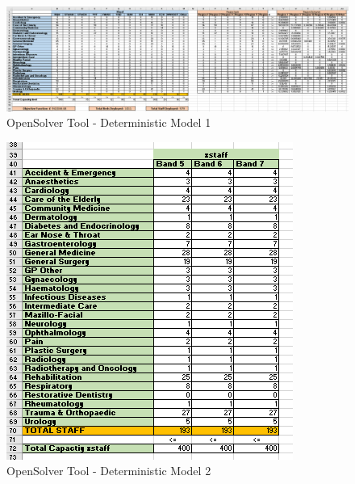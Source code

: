 \documentclass[../thesis.tex]{subfiles}
\begin{document}
\begin{landscape}
\begin{figure}[h!]
    \centering
    \includegraphics{Chapters/Chapter7/Figures/Deterministic1.png}
    \caption{OpenSolver Tool - Deterministic Model 1}
    \label{fig:exdm1}
\end{figure}
\end{landscape}
\begin{figure}
    \centering
    \includegraphics{Chapters/Chapter7/Figures/Deterministic2.png}
    \caption{OpenSolver Tool - Deterministic Model 2}
    \label{fig:exdm2}
\end{figure}












\end{document}
